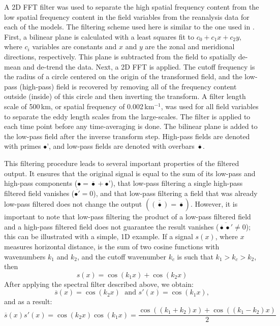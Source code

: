 A 2D FFT filter was used to separate the high spatial frequency content from the low spatial frequency content in the field variables from the reanalysis data for each of the models. The filtering scheme used here is similar to the one used in \citet{scott2005direct}. First, a bilinear plane is calculated with a least squares fit to $c_0 + c_1 x+c_2y$, where $c_i$ variables are constants and $x$ and $y$ are the zonal and meridional directions, respectively. This plane is subtracted from the field to spatially de-mean and de-trend the data. Next, a 2D FFT is applied. The cutoff frequency is the radius of a circle centered on the origin of the transformed field, and the low-pass (high-pass) field is recovered by removing all of the frequency content outside (inside) of this circle and then inverting the transform. A filter length scale of 500\,km, or spatial frequency of 0.002\,km$^{-1}$, was used for all field variables to separate the eddy length scales from the large-scales. The filter is applied to each time point before any time-averaging is done. The bilinear plane is added to the low-pass field after the inverse transform step. High-pass fields are denoted with primes $\bullet’$, and low-pass fields are denoted with overbars $\overline{\bullet}$. \par 
This filtering procedure leads to several important properties of the filtered output. It ensures that the original signal is equal to the sum of its low-pass and high-pass components ($\bullet = \overline{\bullet} + \bullet’$), that low-pass filtering a single high-pass filtered field vanishes ($\overline{\bullet'}  = 0$), and that low-pass filtering a field that was already low-pass filtered does not change the output $\left(\overline{\left(\overline{\bullet}\right)}  = \overline{\bullet}\right)$. However, it is important to note that low-pass filtering the product of a low-pass filtered field and a high-pass filtered field does not guarantee the result vanishes ($\overline{\overline{\bullet}\bullet'}\neq 0$); this can be illustrated with a simple, 1D example. If a signal $s(x)$, where $x$ measures horizontal distance, is the sum of two cosine functions with wavenumbers $k_1$ and $k_2$, and the cutoff wavenumber $k_c$ is such that $k_1 > k_c > k_2$, then
\begin{equation}
s(x) = \cos(k_1x)+\cos(k_2x)
\end{equation}
After applying the spectral filter described above, we obtain:
\begin{equation}
\overline{s}(x) = \cos(k_2x) \; \mbox{ and } s'(x) = \cos(k_1x),    
\end{equation}
and as a result:
\begin{equation}
\overline{s}(x)s'(x) = \cos(k_2x) \cos(k_1x) = \frac{ \cos((k_1+k_2)x) + \cos((k_1-k_2)x) }{2}
\end{equation}



